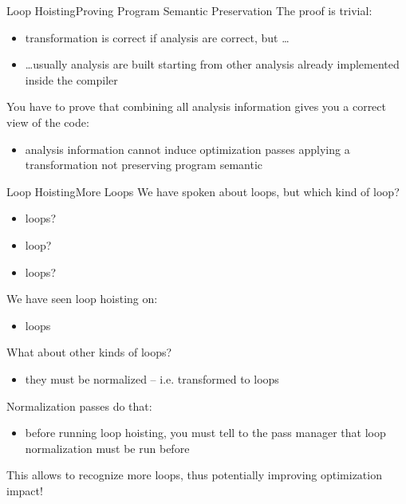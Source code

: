 \documentclass[10pt,mathserif]{beamer}
\begin{document}
\begin{frame}{Loop Hoisting}{Proving Program Semantic Preservation}
The \alert{proof} is trivial:

\begin{itemize}
\item transformation is correct if analysis are correct, but \ldots
\item \ldots usually analysis are built starting from other analysis already
      implemented inside the compiler
\end{itemize}

\vfill
You have to prove that combining all analysis information gives you a
correct view of the code:

\begin{itemize}
\item analysis information cannot induce optimization passes applying a
      transformation not preserving program semantic
\end{itemize}
\end{frame}

\begin{frame}{Loop Hoisting}{More Loops}
We have spoken about loops, but which kind of loop?

\begin{itemize}
\item {} loops?
\item {} loop?
\item {} loops?
\end{itemize}

We have seen loop hoisting on:

\begin{itemize}
\item {} loops
\end{itemize}

What about other kinds of loops?

\begin{itemize}
\item they must be normalized -- i.e. transformed to  loops
\end{itemize}

\alert{Normalization passes} do that:

\begin{itemize}
\item before running loop hoisting, you must tell to the pass manager that loop
      normalization must be run before
\end{itemize}

This allows to recognize more loops, thus potentially
\alert{improving optimization impact}!
\end{frame}
\end{document}
